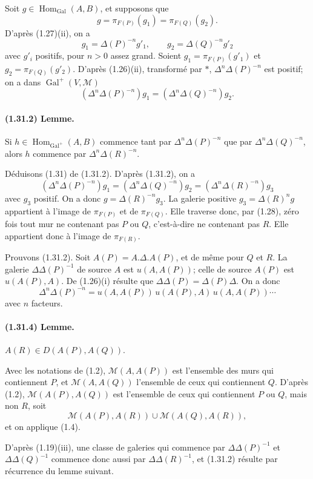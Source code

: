 \documentclass[10pt]{article}
\begin{document}
Soit \(g\in\operatorname{Hom}_{\operatorname{Gal}}(A,B)\), et supposons que
\[
g=\pi_{F(P)}(g_1)=\pi_{F(Q)}(g_2).
\]
D'après (1.27)(ii), on a
\[
g_1=\Delta(P)^{-n}g'_1,\qquad
g_2=\Delta(Q)^{-n}g'_2
\]
avec \(g'_i\) positifs, pour \(n>0\) assez grand. Soient \(g_1=\pi_{F(P)}(g'_1)\) et \(g_2=\pi_{F(Q)}(g'_2)\). D'après (1.26)(ii), transformé par \(*\), \(\Delta^n\Delta(P)^{-n}\) est positif; on a dans \(\operatorname{Gal}^+(V,\mathcal M)\)
\[
\tag{1.31.1}
(\Delta^n\Delta(P)^{-n})g_1=(\Delta^n\Delta(Q)^{-n})g_2.
\]

\paragraph{(1.31.2) Lemme.} Si \(h\in\operatorname{Hom}_{\operatorname{Gal}^+}(A,B)\) commence tant par \(\Delta^n\Delta(P)^{-n}\) que par \(\Delta^n\Delta(Q)^{-n}\), alors \(h\) commence par \(\Delta^n\Delta(R)^{-n}\).

Déduisons (1.31) de (1.31.2). D'après (1.31.2), on a
\[
(\Delta^n\Delta(P)^{-n})g_1=(\Delta^n\Delta(Q)^{-n})g_2=(\Delta^n\Delta(R)^{-n})g_3
\]
avec \(g_3\) positif. On a donc \(g=\Delta(R)^{-n}g_3\). La galerie positive \(g_3=\Delta(R)^n g\) appartient à l'image de \(\pi_{F(P)}\) et de \(\pi_{F(Q)}\). Elle traverse donc, par (1.28), zéro fois tout mur ne contenant pas \(P\) ou \(Q\), c'est-à-dire ne contenant pas \(R\). Elle appartient donc à l'image de \(\pi_{F(R)}\).

Prouvons (1.31.2). Soit \(A(P)=A.\Delta.A(P)\), et de même pour \(Q\) et \(R\). La galerie \(\Delta\Delta(P)^{-1}\) de source \(A\) est \(u(A,A(P))\); celle de source \(A(P)\) est \(u(A(P),A)\). De (1.26)(i) résulte que \(\Delta\Delta(P)=\Delta(P)\Delta\). On a donc
\[
\tag{1.31.3}
\Delta^n\Delta(P)^{-n}=u(A,A(P))\,u(A(P),A)\,u(A,A(P))\cdots
\]
avec \(n\) facteurs.

\paragraph{(1.31.4) Lemme.} \(A(R)\in D(A(P),A(Q))\).

Avec les notations de (1.2), \(\mathcal M(A,A(P))\) est l'ensemble des murs qui contiennent \(P\), et \(\mathcal M(A,A(Q))\) l'ensemble de ceux qui contiennent \(Q\). D'après (1.2), \(\mathcal M(A(P),A(Q))\) est l'ensemble de ceux qui contiennent \(P\) ou \(Q\), mais non \(R\), soit
\[
\mathcal M(A(P),A(R))\cup \mathcal M(A(Q),A(R)),
\]
et on applique (1.4).

D'après (1.19)(iii), une classe de galeries qui commence par \(\Delta\Delta(P)^{-1}\) et \(\Delta\Delta(Q)^{-1}\) commence donc aussi par \(\Delta\Delta(R)^{-1}\), et (1.31.2) résulte par récurrence du lemme suivant.
\end{document}
